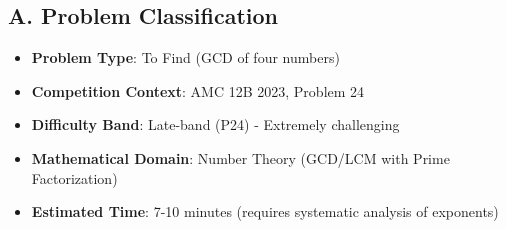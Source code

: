 \documentclass[12pt]{article}
\begin{document}
\begin{problemconfigbox}
\subsection*{A. Problem Classification}
\begin{itemize}[leftmargin=*]
    \item \textbf{Problem Type}: To Find (GCD of four numbers)
    \item \textbf{Competition Context}: AMC 12B 2023, Problem 24
    \item \textbf{Difficulty Band}: Late-band (P24) - Extremely challenging
    \item \textbf{Mathematical Domain}: Number Theory (GCD/LCM with Prime Factorization)
    \item \textbf{Estimated Time}: 7-10 minutes (requires systematic analysis of exponents)
\end{itemize}


\end{problemconfigbox}
\end{document}
